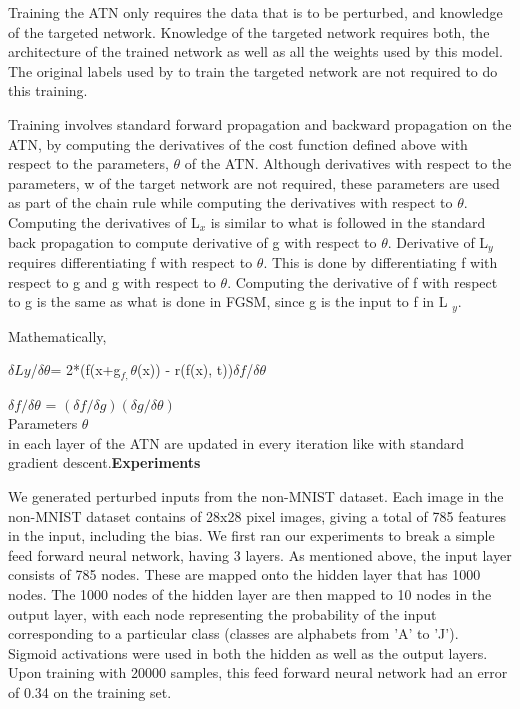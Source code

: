 \documentclass[12pt,a4paper]{article}
\begin{document}
Training the ATN only requires the data that is to be perturbed, and 
knowledge of the targeted network. Knowledge of the targeted network 
requires both, the architecture of the trained network as well as all 
the weights used by this model. The original labels used by to train the 
targeted network are not required to do this training. 



Training involves standard forward propagation and backward propagation 
on the ATN, by computing the derivatives of the cost function defined 
above with respect to the parameters, $\theta $ of the ATN. Although 
derivatives with respect to the parameters, w of the target network are 
not required, these parameters are used as part of the chain rule while 
computing the derivatives with respect to $\theta .$ Computing the 
derivatives of L$_{x}$ is similar to what is followed in the standard 
back propagation to compute derivative of g with respect to $\theta $. 
Derivative of L$_{y}$ requires differentiating f with respect to $
\theta .$ This is done by differentiating f with respect to g and g 
with respect to $\theta .$ Computing the derivative of f with respect 
to g is the same as what is done in FGSM, since g is the input to f in L
$_{y}$. 



Mathematically,

$\delta Ly$/$\delta \theta $= 2*(f(x+g$_{f,}$$\theta $(x)) - 
r(f(x), t))$\delta f$/$\delta \theta $



$\delta f/\delta \theta $ = $(\delta f/\delta g)(\delta g/\delta 
\theta )$\\


Parameters $\theta $\\
in each layer of the ATN are updated in every iteration like with 
standard gradient descent.\textbf{Experiments}

We generated perturbed inputs from the non-MNIST dataset. Each image in 
the non-MNIST dataset contains of 28x28 pixel images, giving a total of 
785 features in the input, including the bias. We first ran our 
experiments to break a simple feed forward neural network, having 3 
layers. As mentioned above, the input layer consists of 785 nodes. These 
are mapped onto the hidden layer that has 1000 nodes. The 1000 nodes of 
the hidden layer are then mapped to 10 nodes in the output layer, with 
each node representing the probability of the input corresponding to a 
particular class (classes are alphabets from 'A' to 'J'). Sigmoid 
activations were used in both the hidden as well as the output layers. 
Upon training with 20000 samples, this feed forward neural network had 
an error of 0.34 on the training set.
\end{document}
